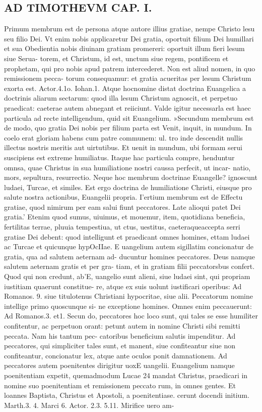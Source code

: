 \documentclass{article}
\begin{document}
\begin{pages}
\section*{AD TIMOTHEVM CAP. I. }
\marginpar{[ p.50 ]}\pstart Primum membrum est de persona atque  autore illius gratiae, nempe Christo lesu seu filio Dei. Vt enim nobis applicaretur Dei gratia, oportuit filium Dei humillari et sua Obedientia nobis diuinam gratiam promereri: oportuit illum fieri lesum siue Serua- torem, et Christum, id est, unctum siue regem, pontificem et prophetam, qui pro nobis apud patrem intercederet. Non est aliud nomen, in quo remissionem pecca- torum consequamur: et gratia acueritas per lesum Christum exorta est. Actor.4.1o. Iohan.1. Atque hocnomine distat doctrina Euangelica a doctrinis aliarum sectarum: quod illa lesum Christum agnoscit, et perpetuo praedicat: caeterae autem abnegant et reiiciunt. Valde igitur necessarla est haec particula ad recte intelligendum, quid sit Euangelium.  \pend\pstart »Secundum membrum est de modo, quo gratia Dei nobis per filium parta est Venit, inquit, in mundum. In coelo erat gloriam habens cum patre communem: ul. tro inde descendit nullis illectus nostris meritis aut uirtutibus. Et uenit in mundum, ubi formam serui suscipiens est extreme humiliatus. Itaque hac particula compre, henduntur omnsa, quae Christus in sua humiliatione nostri caussa perfecit, ut incar- natio, mors, sepultura, resurrectio. Neque hoc membrum doctrinae Euangelle? ignoscunt ludaei, Turcae, et similes. Est ergo doctrina de humiliatione Christi, eiusque  pro salute nostra actionibus, Euangelii propria.  \pend\pstart I’ertium membrum est de Effectu gratiae, quod nimirum per eam salui fiunt peccatores. Late alioqui patet Dei gratia.' Etenim quod sumus, uiuimus, et mouemur, item, quotidiana beneficia, fertilitas terrae, pluuia tempestiua, ut ctus, uestitus, caeteraqueaccepta serri gratiae Dei debent: quod intelligunt et praedicant omnes homines, ettam ludaei ac Turcae et quicunque hypOcIIae. E uangelium autem sigillatim concionatur de gratia, qua ad salutem aeternam ad- ducuntur homines peccatores. Deus namque salutem aeternam gratis et per gra- tiam, et in gratiam filii peccatorsbus confert. Quod qui non credunt, ab’E, uangelio sunt alieni, siue ludaei sint, qui propriam iustitiam quaerunt constitue- re, atque ex suis uolunt iustificari operibus: Ad Romanos. 9. siue titulotenus Christiani hypocritae, siue alii. Peccatorum nomine intellige primo quoscunque si- ne exceptione homines. Omnes enim peccauerunt: Ad Romanos.3. et1. Secun do, peccatores hoc loco sunt, qui tales se esse humiliter confitentur, ac perpetuon orant: petunt autem in nomine Christi sibi remitti peccata. Nam his tantum pec- catoribus beneficium salutis impenditur. Ad peccatores, qui simpliciter tales sunt, et manent, siue confiteantur siue non confiteantur, concionatur lex, atque ante oculos ponit damnationem. Ad peccatores autem poenitentes dirigitur uoxE uangelii. Euangelium namque poenitentiam expetit, quemadmodum Lucae 24 mandat Christus, praedicari in nomine suo poenitentiam et remissionem peccato rum, in omnes gentes. Et loannes Baptista, Christus et Apostoli, a poenitentiase. cerunt docendi initium. Marth.3. 4. Marci 6. Actor. 2.3. 5.11. Mirifice uero am- 
\end{pages}
\end{document}
